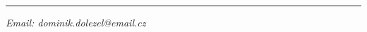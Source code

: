 \setcounter{page}{0}
\thispagestyle{fancy-blank}
\begingroup
{\large \par}
\vspace*{35mm}
{\huge\bfseries\utitle\par}

\vspace*{5mm}
{\Large\usubtitle\par}

\vspace*{4mm}
{\rule{\linewidth}{0.5mm}\par}
\vspace*{4mm}

{\large\bfseries\uauthor\par}\vspace*{1mm}

{\large\itshape\uaffiliation\newline}
{\large\itshape\udate\newline}
{\large\itshape{Email: dominik.dolezel@email.cz}\par}

\vfill
{\large \par}
\endgroup
\clearpage
